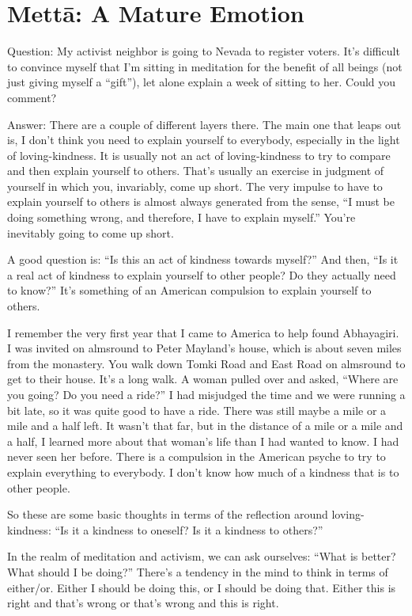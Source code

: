 \chapter{Mettā: A Mature Emotion}

Question: My activist neighbor is going to Nevada to register voters.
It’s difficult to convince myself that I’m sitting in meditation for the
benefit of all beings (not just giving myself a “gift”), let alone
explain a week of sitting to her. Could you comment?

\vspace{\the\qaskip}
Answer: There are a couple of different layers there. The main one that
leaps out is, I don’t think you need to explain yourself to everybody,
especially in the light of loving-kindness. It is usually not an act of
loving-kindness to try to compare and then explain yourself to others.
That’s usually an exercise in judgment of yourself in which you,
invariably, come up short. The very impulse to have to explain yourself
to others is almost always generated from the sense, “I must be doing
something wrong, and therefore, I have to explain myself.” You’re
inevitably going to come up short.

A good question is: “Is this an act of kindness towards myself?” And
then, “Is it a real act of kindness to explain yourself to other people?
Do they actually need to know?” It’s something of an American compulsion
to explain yourself to others.

I remember the very first year that I came to America to help found
Abhayagiri. I was invited on almsround to Peter Mayland’s house, which
is about seven miles from the monastery. You walk down Tomki Road and
East Road on almsround to get to their house. It’s a long walk. A woman
pulled over and asked, “Where are you going? Do you need a ride?” I had
misjudged the time and we were running a bit late, so it was quite good
to have a ride. There was still maybe a mile or a mile and a half left.
It wasn’t that far, but in the distance of a mile or a mile and a half,
I learned more about that woman’s life than I had wanted to know. I had
never seen her before. There is a compulsion in the American psyche to
try to explain everything to everybody. I don’t know how much of a
kindness that is to other people.

So these are some basic thoughts in terms of the reflection around
loving-kindness: “Is it a kindness to oneself? Is it a kindness to
others?”

In the realm of meditation and activism, we can ask ourselves: “What is
better? What should I be doing?” There’s a tendency in the mind to think
in terms of either/or. Either I should be doing this, or I should be
doing that. Either this is right and that’s wrong or that’s wrong and
this is right.

